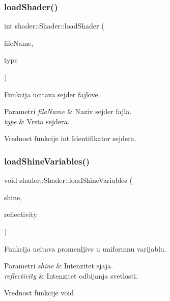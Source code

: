 \subsubsection{\texorpdfstring{load\+Shader()}{loadShader()}}
{\footnotesize\ttfamily int shader\+::\+Shader\+::load\+Shader (\begin{DoxyParamCaption}\item[{const char $\ast$}]{file\+Name,  }\item[{G\+Lenum}]{type }\end{DoxyParamCaption})\hspace{0.3cm}{\ttfamily [private]}}



Funkcija ucitava sejder fajlove. 


\begin{DoxyParams}{Parametri}
{\em file\+Name} & Naziv sejder fajla. \\
\hline
{\em type} & Vrsta sejdera. \\
\hline
\end{DoxyParams}
\begin{DoxyReturn}{Vrednost funkcije}
int Identifikator sejdera. 
\end{DoxyReturn}
\mbox{\label{classshader_1_1Shader_acd4755a3b83ebb6b0577832609cc520f}} 
\subsubsection{\texorpdfstring{load\+Shine\+Variables()}{loadShineVariables()}}
{\footnotesize\ttfamily void shader\+::\+Shader\+::load\+Shine\+Variables (\begin{DoxyParamCaption}\item[{float}]{shine,  }\item[{float}]{reflectivity }\end{DoxyParamCaption})}



Funkcija ucitava promenljive u uniformnu varijablu. 


\begin{DoxyParams}{Parametri}
{\em shine} & Intenzitet sjaja. \\
\hline
{\em reflectivity} & Intenzitet odbijanja svetlosti. \\
\hline
\end{DoxyParams}
\begin{DoxyReturn}{Vrednost funkcije}
void 
\end{DoxyReturn}
\mbox{\label{classshader_1_1Shader_ace9f5d9ac79e04082aafa33c22d9f96c}} 
